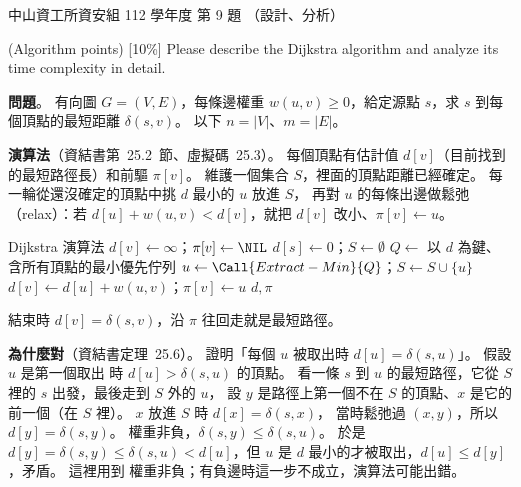 \begin{pastexam}[label={px:nsysu-112-dmalg-09}]{中山資工所資安組 112 學年度 第 9 題}
（設計、分析）

(Algorithm points) [10\%] Please describe the Dijkstra algorithm and analyze its time complexity in detail.
\end{pastexam}

\begin{pastsoln}
\textbf{問題}。 有向圖 $G = (V, E)$，每條邊權重 $w(u, v) \ge 0$，給定源點 $s$，求 $s$ 到每個頂點的最短距離
$\delta(s, v)$。 以下 $n = |V|$、$m = |E|$。

\textbf{演算法}（資結書第~25.2~節、虛擬碼~25.3）。 每個頂點有估計值 $d[v]$（目前找到的最短路徑長）和前驅
$\pi[v]$。 維護一個集合 $S$，裡面的頂點距離已經確定。 每一輪從還沒確定的頂點中挑 $d$ 最小的 $u$ 放進 $S$，
再對 $u$ 的每條出邊做鬆弛（relax）：若 $d[u] + w(u, v) < d[v]$，就把 $d[v]$ 改小、$\pi[v] \gets u$。
\begin{pseudo}{Dijkstra 演算法}
        \State $d[v] \gets \infty$；$\pi[v] \gets \NIL$
    \EndFor
    \State $d[s] \gets 0$；$S \gets \emptyset$
    \State $Q \gets$ 以 $d$ 為鍵、含所有頂點的最小優先佇列
        \State $u \gets \Call{Extract-Min}{Q}$；$S \gets S \cup \{u\}$
             
                \State $d[v] \gets d[u] + w(u, v)$；$\pi[v] \gets u$
                \State {}
            \EndIf
        \EndFor
    \EndWhile
    \State \Return $d, \pi$
\EndFunction
\end{pseudo}
結束時 $d[v] = \delta(s, v)$，沿 $\pi$ 往回走就是最短路徑。

\textbf{為什麼對}（資結書定理~25.6）。 證明「每個 $u$ 被取出時 $d[u] = \delta(s, u)$」。 假設 $u$ 是第一個取出
時 $d[u] > \delta(s, u)$ 的頂點。 看一條 $s$ 到 $u$ 的最短路徑，它從 $S$ 裡的 $s$ 出發，最後走到 $S$ 外的 $u$，
設 $y$ 是路徑上第一個不在 $S$ 的頂點、$x$ 是它的前一個（在 $S$ 裡）。 $x$ 放進 $S$ 時 $d[x] = \delta(s, x)$，
當時鬆弛過 $(x, y)$，所以 $d[y] = \delta(s, y)$。 權重非負，$\delta(s, y) \le \delta(s, u)$。 於是
$d[y] = \delta(s, y) \le \delta(s, u) < d[u]$，但 $u$ 是 $d$ 最小的才被取出，$d[u] \le d[y]$，矛盾。 這裡用到
權重非負；有負邊時這一步不成立，演算法可能出錯。


\end{pastsoln}
